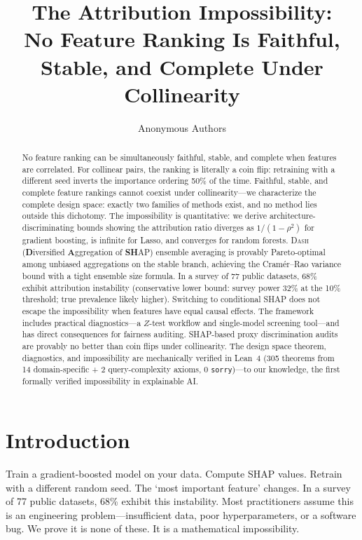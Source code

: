 \documentclass{article}
\title{The Attribution Impossibility:\\{\large No Feature Ranking Is Faithful, Stable, and Complete Under Collinearity}}
\author{Anonymous Authors}
\newcommand{\DASH}{\textsc{Dash}}
\begin{document}
\maketitle

\begin{abstract}
No feature ranking can be simultaneously faithful, stable, and complete when features are correlated. For collinear pairs, the ranking is literally a coin flip: retraining with a different seed inverts the importance ordering 50\% of the time.
Faithful, stable, and complete feature rankings cannot coexist under collinearity---we characterize the complete design space: exactly two families of methods exist, and no method lies outside this dichotomy.
The impossibility is quantitative: we derive architecture-discriminating bounds showing the attribution ratio diverges as $1/(1{-}\rho^2)$ for gradient boosting, is infinite for Lasso, and converges for random forests.
\DASH{} (\textbf{D}iversified \textbf{A}ggregation of \textbf{SH}AP) ensemble averaging is provably Pareto-optimal among unbiased aggregations on the stable branch, achieving the Cram\'er--Rao variance bound with a tight ensemble size formula.
In a survey of 77 public datasets, 68\% exhibit attribution instability (conservative lower bound: survey power 32\% at the 10\% threshold; true prevalence likely higher).
Switching to conditional SHAP does not escape the impossibility when features have equal causal effects.
The framework includes practical diagnostics---a $Z$-test workflow and single-model screening tool---and has direct consequences for fairness auditing.
SHAP-based proxy discrimination audits are provably no better than coin flips under collinearity.
The design space theorem, diagnostics, and impossibility are mechanically verified in Lean~4 (305 theorems from 14 domain-specific + 2 query-complexity axioms, 0 \texttt{sorry})---to our knowledge, the first formally verified impossibility in explainable AI.
\end{abstract}

\section{Introduction}
\label{sec:intro}

Train a gradient-boosted model on your data. Compute SHAP values. Retrain with a different random seed. The `most important feature' changes. In a survey of 77 public datasets, 68\% exhibit this instability. Most practitioners assume this is an engineering problem---insufficient data, poor hyperparameters, or a software bug. We prove it is none of these. It is a mathematical impossibility.
\end{document}
